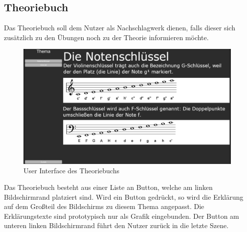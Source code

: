 \subsection*{Theoriebuch}
Das Theoriebuch soll dem Nutzer als Nachschlagwerk dienen, falls dieser sich zusätzlich zu den Übungen noch zu der Theorie informieren möchte. 
\begin{figure}[H]
    \centering
    \includegraphics[width=1\textwidth]{Bilder/theorie.png}
    \caption{User Interface des Theoriebuchs}
    \label{sec:hps_algo}
\end{figure}
Das Theoriebuch besteht aus einer Liste an Button, welche am linken Bildschirmrand platziert sind. Wird ein Button gedrückt, so wird die Erklärung auf dem Großteil des Bildschirms zu diesem Thema angepasst. Die Erklärungstexte sind prototypisch nur als Grafik eingebunden. Der Button am unteren linken Bildschirmrand führt den Nutzer zurück in die letzte Szene. 

\newpage

